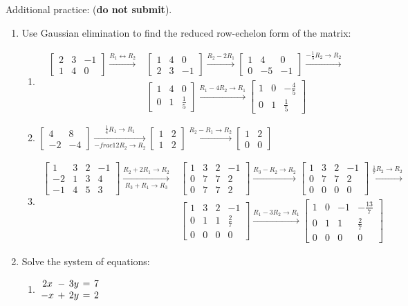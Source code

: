 \documentclass[12pt]{article}
\newcommand{\bbm}{\begin{bmatrix}}
\newcommand{\ebm}{\end{bmatrix}}
\begin{document}
Additional practice: (\textbf{do not submit}).
\begin{enumerate}
\item Use Gaussian elimination to find the reduced row-echelon form of the matrix:

\begin{enumerate}
\item \begin{align*}
\bbm 2&3&-1\\1&4&0\ebm \xrightarrow{R_1\leftrightarrow R_2}& \bbm 1&4&0\\2&3&-1\ebm \xrightarrow{R_2-2R_1}\bbm 1&4&0\\0&-5&-1\ebm
\xrightarrow{-\frac15 R_2\to R_2}\\ & \bbm 1&4&0\\0&1&\frac15\ebm \xrightarrow{R_1-4R_2\to R_1} \bbm 1&0&-\frac45\\0&1&\frac15\ebm
\end{align*}
\item $\bbm 4&8\\-2&-4\ebm\xrightarrow[-frac12 R_2\to R_2]{\frac14 R_1\to R_1}\bbm 1&2\\1&2\ebm \xrightarrow{R_2-R_1\to R_2} \bbm 1&2\\0&0\ebm$
\item 
\begin{align*}
\bbm 1&3&2&-1\\-2&1&3&4\\-1&4&5&3\ebm \xrightarrow[R_3+R_1\to R_3]{R_2+2R_1\to R_2} &\bbm 1&3&2&-1\\0&7&7&2\\0&7&7&2\ebm \xrightarrow{R_3-R_2\to R_2}\bbm 1&3&2&-1\\0&7&7&2\\0&0&0&0\ebm\xrightarrow{\frac17 R_2\to R_2}\\
&\bbm 1&3&2&-1\\0&1&1&\frac27\\0&0&0&0\ebm \xrightarrow{R_1-3R_2\to R_1}\bbm 1&0&-1&-\frac{13}{7}\\0&1&1&\frac27\\0&0&0&0\ebm
\end{align*}


\end{enumerate}

\item Solve the system of equations:

\begin{enumerate}
\item $\arraycolsep2pt\begin{array}{ccccc}
2x&-&3y&=&7\\-x&+&2y&=&2\end{array}$


\end{enumerate}
\end{enumerate}
\end{document}
